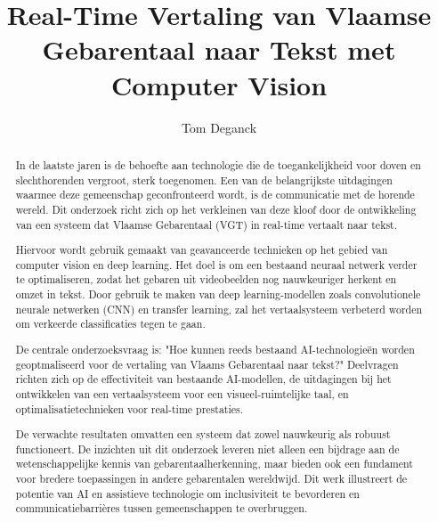 \documentclass{hogent-article}
\title{Real-Time Vertaling van Vlaamse Gebarentaal naar Tekst met Computer Vision}
\author{Tom Deganck}
\begin{document}
\begin{abstract}
In de laatste jaren is de behoefte aan technologie die de toegankelijkheid voor doven en slechthorenden vergroot, sterk toegenomen. Een van de belangrijkste uitdagingen waarmee deze gemeenschap geconfronteerd wordt, is de communicatie met de horende wereld. Dit onderzoek richt zich op het verkleinen van deze kloof door de ontwikkeling van een systeem dat Vlaamse Gebarentaal (VGT) in real-time vertaalt naar tekst.

Hiervoor wordt gebruik gemaakt van geavanceerde technieken op het gebied van computer vision en deep learning. Het doel is om een bestaand neuraal netwerk verder te optimaliseren, zodat het gebaren uit videobeelden nog nauwkeuriger herkent en omzet in tekst. Door gebruik te maken van deep learning-modellen zoals convolutionele neurale netwerken (CNN) en transfer learning, zal het vertaalsysteem verbeterd worden om verkeerde classificaties tegen te gaan.
  
De centrale onderzoeksvraag is: "Hoe kunnen reeds bestaand AI-technologieën worden geoptmaliseerd voor de  vertaling van Vlaams Gebarentaal naar tekst?" Deelvragen richten zich op de effectiviteit van bestaande AI-modellen, de uitdagingen bij het ontwikkelen van een vertaalsysteem voor een visueel-ruimtelijke taal, en optimalisatietechnieken voor real-time prestaties.
  
De verwachte resultaten omvatten een systeem dat zowel nauwkeurig als robuust functioneert. De inzichten uit dit onderzoek leveren niet alleen een bijdrage aan de wetenschappelijke kennis van gebarentaalherkenning, maar bieden ook een fundament voor bredere toepassingen in andere gebarentalen wereldwijd. Dit werk illustreert de potentie van AI en assistieve technologie om inclusiviteit te bevorderen en communicatiebarrières tussen gemeenschappen te overbruggen.
\end{abstract}

\tableofcontents



\printbibliography[heading=bibintoc]
\end{document}
